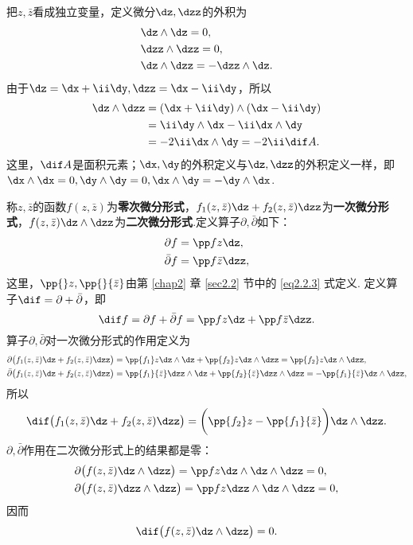把$z,\bar z$看成独立变量，定义微分$\dz,\dzz$的外积为
\begin{align*}
&\dz\wedge \dz=0,\\
&\dzz\wedge \dzz=0,\\
&\dz\wedge \dzz=-\dzz\wedge \dz.
\end{align*}
由于$\dz=\dx+\ii\dy,\dzz=\dx-\ii\dy$，所以
\begin{align*}
\dz\wedge\dzz&=(\dx+\ii\dy)\wedge(\dx-\ii\dy)\\
&=\ii\dy\wedge\dx-\ii\dx\wedge\dy\\
&=-2\ii\dx\wedge\dy=-2\ii\dif A.
\end{align*}
这里，$\dif A$是面积元素；$\dx,\dy$的外积定义与$\dz,\dzz$的外积定义一样，即$\dx\wedge\dx=0,\dy\wedge\dy=0,\dx\wedge\dy=-\dy\wedge\dx$.

称$z,\bar z$的函数$f(z,\bar z)$为\textbf{零次微分形式}，$f_1(z,\bar z)\dz+f_2(z,\bar z)\dzz$为\textbf{一次微分形式}，$f(z,\bar z)\dz\wedge\dzz$为\textbf{二次微分形式}.定义算子$\partial,\bar\partial$如下：
\begin{align*}
&\partial f=\pp fz\dz,\\
&\bar \partial f=\pp f{\bar z}\dzz,
\end{align*}
这里，$\pp{}z,\pp{}{\bar z}$由第 \ref{chap2} 章 \ref{sec2.2} 节中的 \eqref{eq2.2.3} 式定义. 定义算子$\dif =\partial+\bar\partial$，即
\begin{equation}\label{eq3.6.1}
\dif f=\partial f+\bar\partial f=\pp fz\dz+\pp f{\bar z}\dzz.
\end{equation}
算子$\partial,\bar\partial$对一次微分形式的作用定义为
\begin{align*}
\partial\big(f_1(z,\bar z)\dz+f_2(z,\bar z)\dzz\big)
&=\pp{f_1}z\dz\wedge\dz+\pp{f_2}z\dz\wedge\dzz=\pp{f_2}z\dz\wedge\dzz,\\
\bar\partial\big(f_1(z,\bar z)\dz+f_2(z,\bar z)\dzz\big)
&=\pp{f_1}{\bar z}\dzz\wedge\dz+\pp{f_2}{\bar z}\dzz\wedge\dzz=-\pp{f_1}{\bar z}\dz\wedge\dzz,
\end{align*}
所以
\begin{equation}\label{eq3.6.2}
  \dif \big(f_1(z,\bar z)\dz+f_2(z,\bar z)\dzz\big)
  =\bigg(\pp{f_2}z-\pp{f_1}{\bar z}\bigg)\dz\wedge\dzz.
\end{equation}
$\partial,\bar\partial$作用在二次微分形式上的结果都是零：
\begin{align*}
&\partial\big(f(z,\bar z)\dz\wedge\dzz\big)=\pp fz\dz\wedge\dz\wedge\dzz=0,\\
&\partial\big(f(z,\bar z)\dzz\wedge\dzz\big)=\pp fz\dzz\wedge\dz\wedge\dzz=0,
\end{align*}
因而
\begin{equation}\label{eq3.6.3}
\dif \big(f(z,\bar z)\dz\wedge\dzz\big)=0.
\end{equation}

